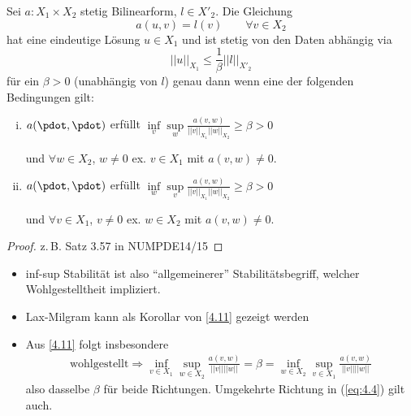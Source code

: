 \begin{satz}[Ne\v{c}as-Theorem] \label{4.11}
Sei $a: X_1 \times X_2$ stetig Bilinearform, $l \in X'_2$. Die Gleichung
\[
	a(u,v) = l(v) \qquad \forall v \in X_2
\]
hat eine eindeutige Lösung $u \in X_1$ und ist stetig von den Daten abhängig via
\[
	||u||_{X_1} \leq \frac{1}{\beta} ||l||_{X'_2}
\]
für ein $\beta > 0$ (unabhängig von $l$) genau dann wenn eine der folgenden Bedingungen gilt:
\begin{enumerate}[i)]
	\item $a(\pdot,\pdot)$ erfüllt $\inf\limits_v \sup\limits_w \frac{a(v,w)}{||v||_{X_1} ||w||_{X_2}} \geq \beta > 0$
	
	und $\forall w \in X_2$, $w \neq 0$ ex. $v \in X_1$ mit $a(v,w) \neq 0$.
	\item $a(\pdot,\pdot)$ erfüllt $\inf\limits_w \sup\limits_v \frac{a(v,w)}{||v||_{X_1} ||w||_{X_2}} \geq \beta > 0$
	
	und $\forall v \in X_1$, $v \neq 0$ ex. $w \in X_2$ mit $a(v,w) \neq 0$.
\end{enumerate}
\begin{proof}
	z.\,B. Satz 3.57 in NUMPDE14/15
\end{proof}
\end{satz}

\begin{bem} \beginwithlistbem
\begin{itemize}
	\item inf-sup Stabilität ist also ``allgemeinerer'' Stabilitätsbegriff, welcher Wohlgestelltheit impliziert.
	\item Lax-Milgram kann als Korollar von \ref{4.11} gezeigt werden
	\item Aus \ref{4.11} folgt insbesondere
	\begin{align} \label{eq:4.4}
		\text{wohlgestellt} \Rightarrow \inf\limits_{v \in X_1} \sup\limits_{w \in X_2} \frac{a(v,w)}{||v|| ||w||} = \beta = \inf\limits_{w \in X_2} \sup\limits_{v \in X_1} \frac{a(v,w)}{||v|| ||w||}
	\end{align}
	also dasselbe $\beta$ für beide Richtungen. Umgekehrte Richtung in (\ref{eq:4.4}) gilt auch.
\end{itemize}
\end{bem}


